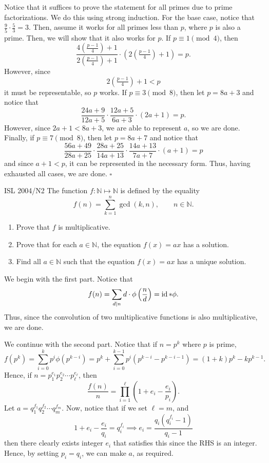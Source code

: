 \documentclass{article}
\begin{document}
Notice that it suffices to prove the statement for all primes due to prime factorizations. We do this using strong induction. For the base case, notice that $\tfrac{9}{5} \cdot \tfrac{5}{3} = 3$. Then, assume it works for all primes less than $p$, where $p$ is also a prime. Then, we will show that it also works for $p$. If $p \equiv 1 \pmod{4}$, then \[\dfrac{4\left(\tfrac{p-1}{4}\right)+1}{2\left(\tfrac{p-1}{4}\right)+1} \cdot \left(2\left(\tfrac{p-1}{4}\right)+1\right) = p.\] However, since \[2\left(\tfrac{p-1}{4}\right)+1 < p\] it must be representable, so $p$ works. If $p \equiv 3 \pmod{8}$, then let $p = 8a+3$ and notice that \[\dfrac{24a+9}{12a+5}\cdot \dfrac{12a+5}{6a+3} \cdot (2a+1) = p.\] However, since $2a+1 < 8a+3$, we are able to represent $a$, so we are done. Finally, if $p \equiv 7 \pmod{8}$, then let $p = 8a+7$ and notice that \[\dfrac{56a+49}{28a+25}\cdot \dfrac{28a+25}{14a+13}\cdot \dfrac{14a+13}{7a+7} \cdot (a+1) = p\] and since $a+1 < p$, it can be represented in the necessary form. Thus, having exhausted all cases, we are done. $\square$

\begin{problem}[3.7.15]{ISL 2004/N2}
The function $f: \mathbb{N} \mapsto \mathbb{N}$ is defined by the equality \[f(n) = \sum_{k=1}^n \gcd(k, n), \qquad n \in \mathbb{N}.\]
\begin{enumerate}
\item Prove that $f$ is multiplicative.
\item Prove that for each $a \in \mathbb{N}$, the equation $f(x) = ax$ has a solution.
\item Find all $a \in \mathbb{N}$ such that the equation $f(x) = ax$ has a unique solution.
\end{enumerate}
\end{problem}

We begin with the first part. Notice that \[f(n) = \sum_{d \mid n} d\cdot\phi\left(\dfrac{n}{d}\right) = \operatorname{id} * \phi.\] Thus, since the convolution of two multiplicative functions is also multiplicative, we are done.

We continue with the second part. Notice that if $n = p^k$ where $p$ is prime, \[f(p^k) = \sum_{i=0}^k p^i \phi(p^{k-i}) = p^k + \sum_{i=0}^{k-1} p^i(p^{k-i}-p^{k-i-1}) = (1+k)p^k - kp^{k-1}.\] Hence, if $n = p_1^{e_1}p_2^{e_2}\cdots p_{\ell}^{e_{\ell}}$, then \[\dfrac{f(n)}{n} = \prod_{i=1}^{\ell} \left(1+e_i-\dfrac{e_i}{p_i}\right).\] Let $a = q_1^{f_1}q_2^{f_2}\cdots q_m^{f_m}$. Now, notice that if we set $\ell = m$, and \[1+e_i-\dfrac{e_i}{q_i} = q_i^{f_i} \implies e_i = \dfrac{q_i(q_i^{f_i}-1)}{q_i-1}\] then there clearly exists integer $e_i$ that satisfies this since the RHS is an integer. Hence, by setting $p_i = q_i$, we can make $a$, as required.
\end{document}
